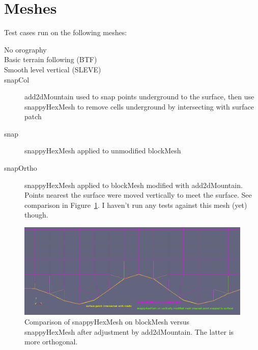 \section{Meshes}

Test cases run on the following meshes:
\begin{description}
\item[No orography]
\item[Basic terrain following (BTF)]
\item[Smooth level vertical (SLEVE)]
\item[snapCol]{add2dMountain used to snap points underground to the surface, then use snappyHexMesh to remove cells underground by intersecting with surface patch}
\item[snap]{snappyHexMesh applied to unmodified blockMesh}
\item[snapOrtho]{snappyHexMesh applied to blockMesh modified with add2dMountain.  Points nearest the surface were moved vertically to meet the surface.  See comparison in Figure~\ref{fig:snap-mesh-compare}.  I haven't run any tests against this mesh (yet) though.}
\end{description}

\begin{figure}
\includegraphics[width=\textwidth]{interim-results/cutCellWarpToSurfaceSchaerExp.png}
\caption{Comparison of snappyHexMesh on blockMesh versus snappyHexMesh after adjustment by add2dMountain.  The latter is more orthogonal.}
\label{fig:snap-mesh-compare}
\end{figure}
